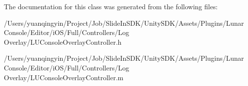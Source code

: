 The documentation for this class was generated from the following files\+:\begin{DoxyCompactItemize}
\item 
/\+Users/yuanqingyin/\+Project/\+Job/\+Slide\+In\+S\+D\+K/\+Unity\+S\+D\+K/\+Assets/\+Plugins/\+Lunar\+Console/\+Editor/i\+O\+S/\+Full/\+Controllers/\+Log Overlay/L\+U\+Console\+Overlay\+Controller.\+h\item 
/\+Users/yuanqingyin/\+Project/\+Job/\+Slide\+In\+S\+D\+K/\+Unity\+S\+D\+K/\+Assets/\+Plugins/\+Lunar\+Console/\+Editor/i\+O\+S/\+Full/\+Controllers/\+Log Overlay/L\+U\+Console\+Overlay\+Controller.\+m\end{DoxyCompactItemize}
